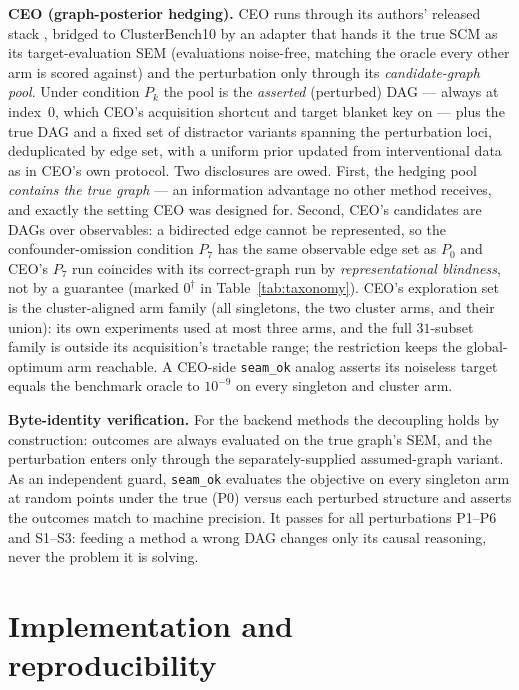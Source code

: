 \documentclass[twoside]{article}
\newcommand{\CEO}{\textsc{CEO}}
\begin{document}
\textbf{\CEO{} (graph-posterior hedging).} \CEO{} runs through its authors'
released stack \citep{branchini2023ceo}, bridged to ClusterBench10 by an
adapter that hands it the true SCM as its target-evaluation SEM (evaluations
noise-free, matching the oracle every other arm is scored against) and the
perturbation only through its \emph{candidate-graph pool}. Under condition
$P_k$ the pool is the \emph{asserted} (perturbed) DAG --- always at index~0,
which \CEO{}'s acquisition shortcut and target blanket key on --- plus the
true DAG and a fixed set of distractor variants spanning the perturbation
loci, deduplicated by edge set, with a uniform prior updated from
interventional data as in \CEO{}'s own protocol. Two disclosures are owed.
First, the hedging pool \emph{contains the true graph} --- an information
advantage no other method receives, and exactly the setting \CEO{} was
designed for. Second, \CEO{}'s candidates are DAGs over observables: a
bidirected edge cannot be represented, so the confounder-omission condition
$P_7$ has the same observable edge set as $P_0$ and \CEO{}'s $P_7$ run
coincides with its correct-graph run by \emph{representational blindness},
not by a guarantee (marked $0^{\dagger}$ in Table~\ref{tab:taxonomy}).
\CEO{}'s exploration set is the cluster-aligned arm family (all singletons,
the two cluster arms, and their union): its own experiments used at most
three arms, and the full $31$-subset family is outside its acquisition's
tractable range; the restriction keeps the global-optimum arm reachable. A
\CEO{}-side \texttt{seam\_ok} analog asserts its noiseless target equals the
benchmark oracle to $10^{-9}$ on every singleton and cluster arm.

\textbf{Byte-identity verification.} For the backend methods the decoupling holds
by construction: outcomes are always evaluated on the true graph's SEM, and the
perturbation enters only through the separately-supplied assumed-graph variant.
As an independent guard, \texttt{seam\_ok} evaluates the objective on every
singleton arm at random points under the true (P0) versus each perturbed
structure and asserts the outcomes match to machine precision. It passes for all
perturbations P1--P6 and S1--S3: feeding a method a wrong DAG changes only its causal
reasoning, never the problem it is solving.

\section{Implementation and reproducibility}\label{app:repro}
\end{document}
